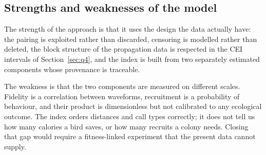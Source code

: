 \subsection{Strengths and weaknesses of the model}

The strength of the approach is that it uses the design the data actually have: the pairing is
exploited rather than discarded, censoring is modelled rather than deleted, the block structure
of the propagation data is respected in the CEI intervals of Section~\ref{sec:q4}, and the index
is built from two separately estimated components whose provenance is traceable.

The weakness is that the two components are measured on different scales. Fidelity is a
correlation between waveforms, recruitment is a probability of behaviour, and their product is
dimensionless but not calibrated to any ecological outcome. The index orders distances and call
types correctly; it does not tell us how many calories a bird saves, or how many recruits a
colony needs. Closing that gap would require a fitness-linked experiment that the present data
cannot supply.
